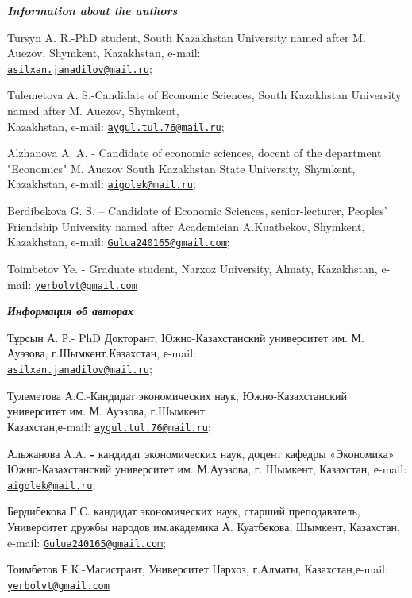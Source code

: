 \begin{authorinfo}
\emph{{\bfseries Information about the authors}}

Tursyn A. R.-PhD student, South Kazakhstan University named after M.
Auezov, Shymkent, Kazakhstan,
e-mail: \\\href{mailto:asilxan.janadilov@mail.ru}{\nolinkurl{asilxan.janadilov@mail.ru}};

Tulemetova A. S.-Candidate of Economic Sciences, South Kazakhstan
University named after M. Auezov, Shymkent, \\Kazakhstan,
e-mail: \href{mailto:aygul.tul.76@mail.ru}{\nolinkurl{aygul.tul.76@mail.ru}};

Alzhanova A. A. - Candidate of economic sciences, docent of the
department "Economics" M. Auezov South Kazakhstan State University,
Shymkent, Kazakhstan, e-mail:
\href{mailto:aigolek@mail.ru}{\nolinkurl{aigolek@mail.ru}};

Berdibekova G. S. -- Candidate of Economic Sciences, senior-lecturer,
Peoples'{} Friendship University named after Academician
A.Kuatbekov, Shymkent, Kazakhstan, e-mail:
\href{mailto:Gulua240165@gmail.com}{\nolinkurl{Gulua240165@gmail.com}};

Toimbetov Ye. - Graduate student, Narxoz University, Almaty,
Kazakhstan, e-mail:
\href{mailto:yerbolvt@gmail.com}{\nolinkurl{yerbolvt@gmail.com}}

\emph{{\bfseries Информация об авторах}}

Тұрсын А. Р.- PhD Докторант, Южно-Казахстанский университет им. М.
Ауэзова, г.Шымкент.Казахстан,
е-mail: \\\href{mailto:asilxan.janadilov@mail.ru}{\nolinkurl{asilxan.janadilov@mail.ru}};

Тулеметова А.С.-Кандидат экономических наук, Южно-Казахстанский
университет им. М. Ауэзова, г.Шымкент.\\
Казахстан,е-mail: \href{mailto:aygul.tul.76@mail.ru}{\nolinkurl{aygul.tul.76@mail.ru}};

Альжанова A.A. {\bfseries -} кандидат экономических наук, доцент кафедры
«Экономика» Южно-Казахстанский университет им. М.Ауэзова, г. Шымкент,
Казахстан, е-mail:
\href{mailto:aigolek@mail.ru}{\nolinkurl{aigolek@mail.ru}};

Бердибекова Г.С. кандидат экономических наук, старший преподаватель,
Университет дружбы народов им.академика А. Куатбекова, Шымкент,
Казахстан, e-mail:
\href{mailto:Gulua240165@gmail.com}{\nolinkurl{Gulua240165@gmail.com}};

Тоимбетов Е.К.-Магистрант, Университет Нархоз, г.Алматы,
Казахстан,е-mail:
\href{mailto:yerbolvt@gmail.com}{\nolinkurl{yerbolvt@gmail.com}}
\end{authorinfo}
